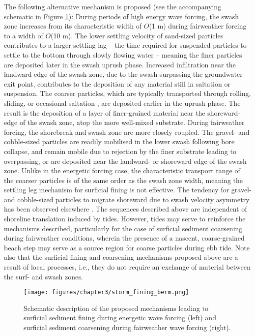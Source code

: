 \documentclass[jmse,article,submit,pdftex,moreauthors]{Definitions/mdpi}
\begin{document}
The following alternative mechanism is proposed (see the accompanying schematic in Figure \ref{fig:storm_fining}): During periods of high energy wave forcing, the swash zone increases from its characteristic width of $O$(1 m) during fairweather forcing to a width of $O$(10 m). The lower settling velocity of sand-sized particles contributes to a larger settling lag -- the time required for suspended particles to settle to the bottom through slowly flowing water \citep{Masselink_Puleo2006} -- meaning the finer particles are deposited later in the swash uprush phase. Increased infiltration near the landward edge of the swash zone, due to the swash surpassing the groundwater exit point, contributes to the deposition of any material still in saltation or suspension. The coarser particles, which are typically transported through rolling, sliding, or occasional saltation \citep{Carter_Orford1984}, are deposited earlier in the uprush phase. The result is the deposition of a layer of finer-grained material near the shoreward-edge of the swash zone, atop the more well-mixed substrate. During fairweather forcing, the shorebreak and swash zone are more closely coupled. The gravel- and cobble-sized particles are readily mobilised in the lower swash following bore collapse, and remain mobile due to rejection by the finer substrate leading to overpassing, or are deposited near the landward- or shoreward edge of the swash zone. Unlike in the energetic forcing case, the characteristic transport range of the coarser particles is of the same order as the swash zone width, meaning the settling leg mechanism for surficial fining is not effective. The tendency for gravel- and cobble-sized particles to migrate shoreward due to swash velocity asymmetry has been observed elsewhere \citep{Carr1983}. The sequences described above are independent of shoreline translation induced by tides. However, tides may serve to reinforce the mechanisms described, particularly for the case of surficial sediment coarsening during fairweather conditions, wherein the presence of a nascent, coarse-grained beach step may serve as a source region for coarse particles during ebb tide. Note also that the surficial fining and coarsening mechanisms proposed above are a result of local processes, i.e., they do not require an exchange of material between the surf- and swash zones.

\begin{figure}[tbp] %
	\begin{center}
		\texttt{[image: figures/chapter3/storm\_fining\_berm.png]}
		\caption[Schematic description of surficial sediment fining mechanisms during energetic wave forcing]{Schematic description of the proposed mechanisms leading to surficial sediment fining during energetic wave forcing (left) and surficial sediment coarsening during fairweather wave forcing (right).}
		\label{fig:storm_fining}
	\end{center}
\end{figure}
\end{document}

